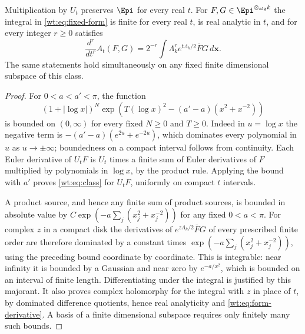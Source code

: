 \begin{lemma}
\label{wt:lem:domination}
Multiplication by $U_t$ preserves $\Epi$ for every real $t$.
For $F,G\in\Epi^{\otimes_{\mathrm{alg}} k}$ the integral
in \eqref{wt:eq:fixed-form} is finite for every real $t$, is
real analytic in $t$, and for every integer $r\geq0$ satisfies
\begin{equation}\label{wt:eq:form-derivative}
 \frac{d^r}{dt^r}A_t(F,G)
 =2^{-r}\int\Lambda_k^r e^{t\Lambda_k/2}\overline F G\,d\mathbf x.
\end{equation}
The same statements hold simultaneously on any fixed finite
dimensional subspace of this class.
\end{lemma}

\begin{proof}
For $0<a<a'<\pi$, the function
\[
 (1+|\log x|)^N
 \exp\!\left(T(\log x)^2-(a'-a)(x^2+x^{-2})\right)
\]
is bounded on $(0,\infty)$ for every fixed $N\geq0$ and $T\geq0$.
Indeed in $u=\log x$ the negative term is
$-(a'-a)(e^{2u}+e^{-2u})$, which dominates every polynomial
in $u$ as $u\to\pm\infty$; boundedness on a compact interval
follows from continuity.  Each Euler derivative of $U_tF$ is
$U_t$ times a finite sum of Euler derivatives of $F$ multiplied
by polynomials in $\log x$, by the product rule.  Applying the
bound with $a'$ proves \eqref{wt:eq:class} for $U_tF$, uniformly
on compact $t$ intervals.

A product source, and hence any finite sum of product sources,
is bounded in absolute value by
$C\exp(-a\sum_j(x_j^2+x_j^{-2}))$ for any fixed $0<a<\pi$.
For complex $z$ in a compact disk the derivatives of
$e^{z\Lambda_k/2}\overline F G$ of every prescribed finite
order are therefore dominated by a constant times
$\exp(-a\sum_j(x_j^2+x_j^{-2}))$, using the preceding bound
coordinate by coordinate.  This is integrable: near infinity
it is bounded by a Gaussian and near zero by $e^{-a/x^2}$,
which is bounded on an interval of finite length.  Differentiating
under the integral is justified by this majorant.  It also proves
complex holomorphy for the integral with $z$ in place of $t$,
by dominated difference quotients, hence real analyticity and
\eqref{wt:eq:form-derivative}.  A basis of a finite dimensional
subspace requires only finitely many such bounds.
\end{proof}

